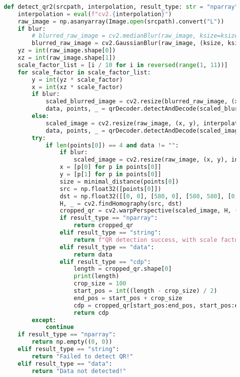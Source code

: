 \begin{lstlisting}[language=Python]
    
    def detect_qr2(srcpath, interpolation, result_type: str = "nparray", blur: bool = True, ksize: int = 7):
        interpolation = eval(f"cv2.{interpolation}")
        raw_image = np.asanyarray(Image.open(srcpath).convert("L"))
        if blur:
            # blurred_raw_image = cv2.medianBlur(raw_image, ksize=ksize)
            blurred_raw_image = cv2.GaussianBlur(raw_image, (ksize, ksize), 0)
        yz = int(raw_image.shape[0])
        xz = int(raw_image.shape[1])
        scale_factor_list = [i / 10 for i in reversed(range(1, 11))]
        for scale_factor in scale_factor_list:
            y = int(yz * scale_factor)
            x = int(xz * scale_factor)
            if blur:
                scaled_blurred_image = cv2.resize(blurred_raw_image, (x, y), interpolation=interpolation)
                data, points, _ = qrDecoder.detectAndDecode(scaled_blurred_image)
            else:
                scaled_image = cv2.resize(raw_image, (x, y), interpolation=interpolation)
                data, points, _ = qrDecoder.detectAndDecode(scaled_image)
            try:
                if len(points[0]) == 4 and data != "":
                    if blur:
                        scaled_image = cv2.resize(raw_image, (x, y), interpolation=interpolation)
                    x = [p[0] for p in points[0]]
                    y = [p[1] for p in points[0]]
                    size = minimal_distance(points[0])
                    src = np.float32([points[0]])
                    dst = np.float32([[0, 0], [580, 0], [580, 580], [0, 580]])
                    H, _ = cv2.findHomography(src, dst)
                    cropped_qr = cv2.warpPerspective(scaled_image, H, (580, 580))
                    if result_type == "nparray":
                        return cropped_qr
                    elif result_type == "string":
                        return f"QR detection success, with scale factor: {scale_factor}!"
                    elif result_type == "data":
                        return data
                    elif result_type == "cdp":
                        length = cropped_qr.shape[0]
                        print(length)
                        crop_size = 100
                        start_pos = int((length - crop_size) / 2)
                        end_pos = start_pos + crop_size
                        cdp = cropped_qr[start_pos:end_pos, start_pos:end_pos]
                        return cdp
            except:
                continue
        if result_type == "nparray":
            return np.empty((0, 0))
        elif result_type == "string":
            return "Failed to detect QR!"
        elif result_type == "data":
            return "Data not detected!"
    

\end{lstlisting}
